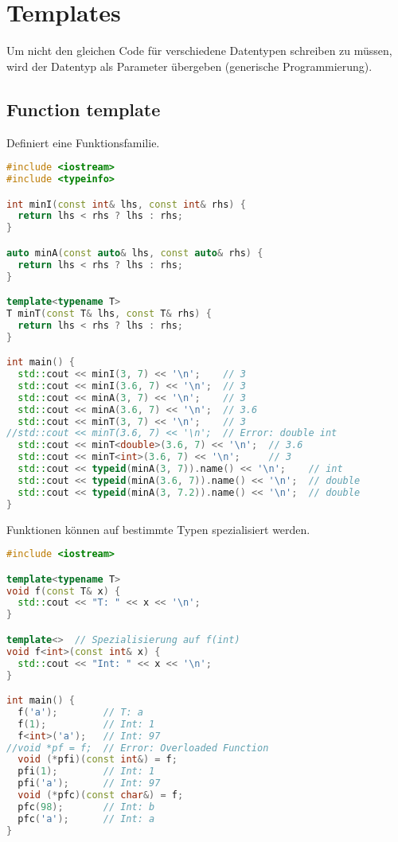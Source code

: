 \section{Templates}

Um nicht den gleichen Code für verschiedene Datentypen schreiben zu müssen, wird
der Datentyp als Parameter übergeben (generische Programmierung).

\subsection{Function template}

Definiert eine Funktionsfamilie.

\begin{lstlisting}[language=C++]
#include <iostream>
#include <typeinfo>

int minI(const int& lhs, const int& rhs) {
  return lhs < rhs ? lhs : rhs;
}

auto minA(const auto& lhs, const auto& rhs) {
  return lhs < rhs ? lhs : rhs;
}

template<typename T>
T minT(const T& lhs, const T& rhs) {
  return lhs < rhs ? lhs : rhs;
}

int main() {
  std::cout << minI(3, 7) << '\n';    // 3
  std::cout << minI(3.6, 7) << '\n';  // 3
  std::cout << minA(3, 7) << '\n';    // 3
  std::cout << minA(3.6, 7) << '\n';  // 3.6
  std::cout << minT(3, 7) << '\n';    // 3
//std::cout << minT(3.6, 7) << '\n';  // Error: double int
  std::cout << minT<double>(3.6, 7) << '\n';  // 3.6
  std::cout << minT<int>(3.6, 7) << '\n';     // 3
  std::cout << typeid(minA(3, 7)).name() << '\n';    // int
  std::cout << typeid(minA(3.6, 7)).name() << '\n';  // double
  std::cout << typeid(minA(3, 7.2)).name() << '\n';  // double
}
\end{lstlisting}

Funktionen können auf bestimmte Typen spezialisiert werden.

\begin{lstlisting}[language=C++]
#include <iostream>

template<typename T>
void f(const T& x) {
  std::cout << "T: " << x << '\n';
}

template<>  // Spezialisierung auf f(int)
void f<int>(const int& x) {
  std::cout << "Int: " << x << '\n';
}

int main() {
  f('a');        // T: a
  f(1);          // Int: 1
  f<int>('a');   // Int: 97
//void *pf = f;  // Error: Overloaded Function
  void (*pfi)(const int&) = f;
  pfi(1);        // Int: 1
  pfi('a');      // Int: 97
  void (*pfc)(const char&) = f;
  pfc(98);       // Int: b
  pfc('a');      // Int: a
}
\end{lstlisting}

